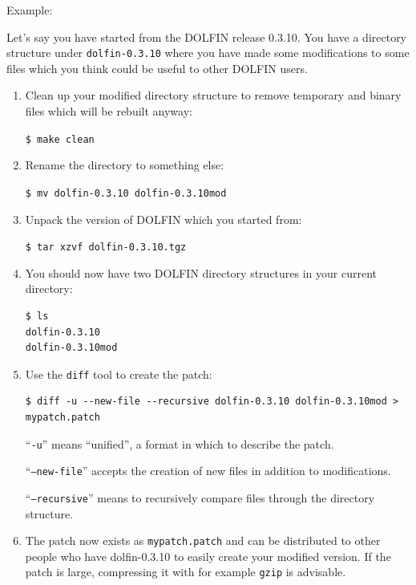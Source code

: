 \documentclass[12pt]{article}
\begin{document}
Example:

Let's say you have started from the DOLFIN release 0.3.10. You have a
directory structure under \texttt{dolfin-0.3.10} where you have made
some modifications to some files which you think could be useful to
other DOLFIN users.

\begin{enumerate}
\item{

Clean up your modified directory structure to remove temporary and binary
files which will be rebuilt anyway:

\texttt{\$ make clean}
}
\item{

Rename the directory to something else:

\texttt{\$ mv dolfin-0.3.10 dolfin-0.3.10mod}
}
\item{

Unpack the version of DOLFIN which you started from:

\texttt{\$ tar xzvf dolfin-0.3.10.tgz}
}

\item{

You should now have two DOLFIN directory structures in your current directory:

\begin{verbatim}
$ ls
dolfin-0.3.10
dolfin-0.3.10mod
\end{verbatim}
}

\item{

Use the \texttt{diff} tool to create the patch:

\begin{verbatim}
$ diff -u --new-file --recursive dolfin-0.3.10 dolfin-0.3.10mod >
mypatch.patch
\end{verbatim}

``\texttt{-u}'' means ``unified'', a format in which to describe the patch.

``\texttt{--new-file}'' accepts the creation of new files in addition to modifications.

``\texttt{--recursive}'' means to recursively compare files through the
directory structure.


}
\item{

The patch now exists as \texttt{mypatch.patch} and can be distributed
to other people who have dolfin-0.3.10 to easily create your modified
version.  If the patch is large, compressing it with for example
\texttt{gzip} is advisable.

}

\end{enumerate}
\end{document}
